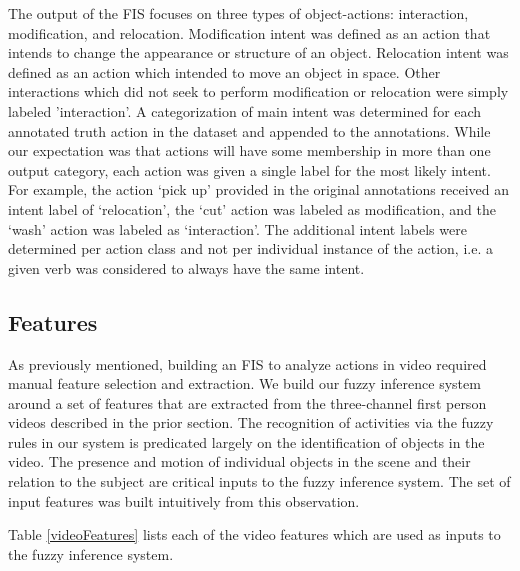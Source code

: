 \documentclass[12pt]{report}
\begin{document}
The output of the FIS focuses on three types of object-actions: interaction, modification, and relocation. Modification intent was defined as an action that intends to change the appearance or structure of an object. Relocation intent was defined as an action which intended to move an object in space. Other interactions which did not seek to perform modification or relocation were simply labeled 'interaction'. A categorization of main intent was determined for each annotated truth action in the dataset and appended to the annotations. While our expectation was that actions will have some membership in more than one output category, each action was given a single label for the most likely intent. For example, the action `pick up' provided in the original annotations received an intent label of `relocation', the `cut' action was labeled as modification, and the `wash' action was labeled as `interaction'. The additional intent labels were determined per action class and not per individual instance of the action, i.e. a given verb was considered to always have the same intent.

\subsection{Features}
As previously mentioned, building an FIS to analyze actions in video required manual feature selection and extraction. We build our fuzzy inference system around a set of features that are extracted from the three-channel first person videos described in the prior section. The recognition of activities via the fuzzy rules in our system is predicated largely on the identification of objects in the video. The presence and motion of individual objects in the scene and their relation to the subject are critical inputs to the fuzzy inference system. The set of input features was built intuitively from this observation.

Table \ref{videoFeatures} lists each of the video features which are used as inputs to the fuzzy inference system.
\end{document}
